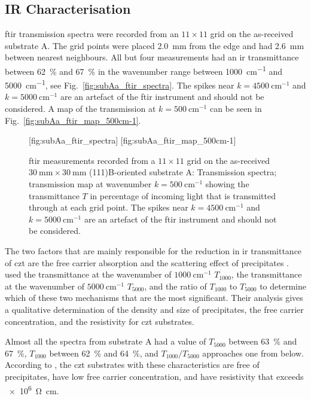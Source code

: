 \subsection{IR Characterisation}

\Ac{ftir} transmission spectra were recorded from an $11\times11$ grid on the as-received substrate A. The grid points were placed \SI{2.0}{\milli\metre} from the edge and had \SI{2.6}{\milli\metre} between nearest neighbours. All but four measurements had an \ac{ir} transmittance between \SI{62}{\percent} and \SI{67}{\percent} in the wavenumber range between \SI{1000}{\centi\metre^{-1}} and \SI{5000}{\centi\metre^{-1}}, see Fig.~\ref{fig:subAa_ftir_spectra}. The spikes near $k=\SI{4500}{\centi\metre^{-1}}$ and $k=\SI{5000}{\centi\metre^{-1}}$ are an artefact of the \ac{ftir} instrument and should not be considered. A map of the transmission at $k=\SI{500}{\centi\metre^{-1}}$ can be seen in Fig.~\ref{fig:subAa_ftir_map_500cm-1}.

\begin{figure}[htbp]
    \centering
    [fig:subAa_ftir_spectra]
    \hfill
    [fig:subAa_ftir_map_500cm-1]
    \caption[\Ac{ftir} measurements of the as-received substrate A.]{\Ac{ftir} measurements recorded from a $11\times11$ grid on the as-received $\SI{30}{\milli\metre}\times\SI{30}{\milli\metre}$ (111)B-oriented substrate A:  Transmission spectra;  transmission map at wavenumber $k=\SI{500}{\centi\metre^{-1}}$ showing the transmittance $T$ in percentage of incoming light that is transmitted through at each grid point. The spikes near $k=\SI{4500}{\centi\metre^{-1}}$ and $k=\SI{5000}{\centi\metre^{-1}}$ are an artefact of the \ac{ftir} instrument and should not be considered.}
\end{figure}

The two factors that are mainly responsible for the reduction in \ac{ir} transmittance of \ac{czt} are the free carrier absorption and the scattering effect of precipitates \citep{yadava1994precipitation}. \citet{yujie2004infrared} used the transmittance at the wavenumber of $\SI{1000}{\centi\metre^{-1}}$ $T_{1000}$, the transmittance at the wavenumber of $\SI{5000}{\centi\metre^{-1}}$ $T_{5000}$, and the ratio of $T_{1000}$ to $T_{5000}$ to determine which of these two mechanisms that are the most significant. Their analysis gives a qualitative determination of the density and size of  precipitates, the free carrier concentration, and the resistivity for \ac{czt} substrates. %

Almost all the spectra from substrate A had a value of $T_{5000}$ between \SI{63}{\percent} and \SI{67}{\percent}, $T_{1000}$ between \SI{62}{\percent} and \SI{64}{\percent}, and $T_{1000}/T_{5000}$ approaches one from below. According to \citet{yujie2004infrared}, the \ac{czt} substrates with these characteristics are free of precipitates, have low free carrier concentration, and have resistivity that exceeds \SI{e6}{\ohm\centi\metre}.%
